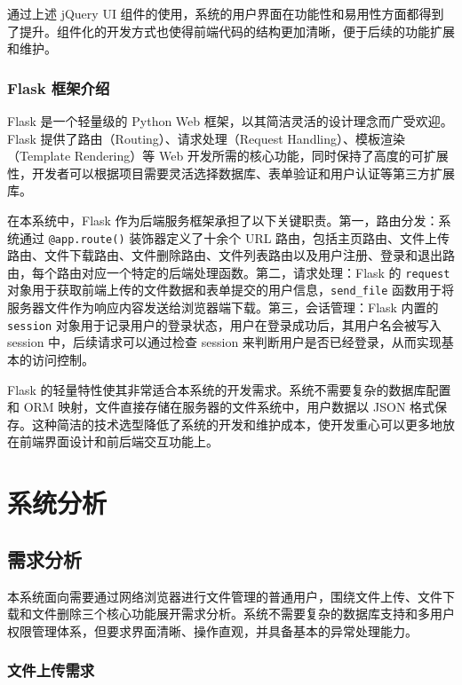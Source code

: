 \documentclass[UTF8,zihao=-4]{ctexrep}
\begin{document}
通过上述 jQuery UI 组件的使用，系统的用户界面在功能性和易用性方面都得到了提升。组件化的开发方式也使得前端代码的结构更加清晰，便于后续的功能扩展和维护。

\subsection{Flask 框架介绍}

Flask 是一个轻量级的 Python Web 框架，以其简洁灵活的设计理念而广受欢迎。Flask 提供了路由（Routing）、请求处理（Request Handling）、模板渲染（Template Rendering）等 Web 开发所需的核心功能，同时保持了高度的可扩展性，开发者可以根据项目需要灵活选择数据库、表单验证和用户认证等第三方扩展库。

在本系统中，Flask 作为后端服务框架承担了以下关键职责。第一，路由分发：系统通过 \texttt{@app.route()} 装饰器定义了十余个 URL 路由，包括主页路由、文件上传路由、文件下载路由、文件删除路由、文件列表路由以及用户注册、登录和退出路由，每个路由对应一个特定的后端处理函数。第二，请求处理：Flask 的 \texttt{request} 对象用于获取前端上传的文件数据和表单提交的用户信息，\texttt{send\_file} 函数用于将服务器文件作为响应内容发送给浏览器端下载。第三，会话管理：Flask 内置的 \texttt{session} 对象用于记录用户的登录状态，用户在登录成功后，其用户名会被写入 session 中，后续请求可以通过检查 session 来判断用户是否已经登录，从而实现基本的访问控制。

Flask 的轻量特性使其非常适合本系统的开发需求。系统不需要复杂的数据库配置和 ORM 映射，文件直接存储在服务器的文件系统中，用户数据以 JSON 格式保存。这种简洁的技术选型降低了系统的开发和维护成本，使开发重心可以更多地放在前端界面设计和前后端交互功能上。


\chapter{系统分析}

\section{需求分析}

本系统面向需要通过网络浏览器进行文件管理的普通用户，围绕文件上传、文件下载和文件删除三个核心功能展开需求分析。系统不需要复杂的数据库支持和多用户权限管理体系，但要求界面清晰、操作直观，并具备基本的异常处理能力。

\subsection{文件上传需求}
\end{document}
